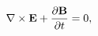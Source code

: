 \begin{equation}\label{faraday}
\nabla\times{\bf E} + \frac{\partial{\bf B}}{\partial t} = 0,
\end{equation}

